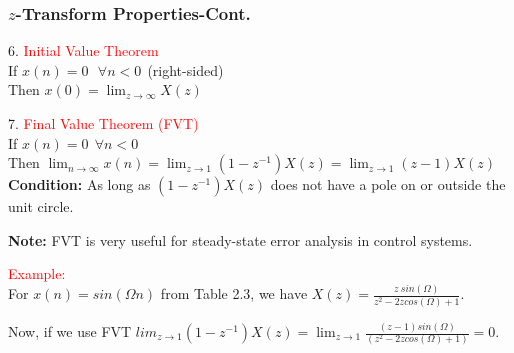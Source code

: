 \documentclass[mathserif, 10pt]{beamer} %
\begin{document}
\frame
{
\frametitle{$z$-Transform Properties-Cont.}

6. \textcolor{red} {Initial Value Theorem}\\ \vspace{.1in}
If $x(n) = 0~~~\forall n<0 ~~$(right-sided)\\ \vspace{.1in}
Then $x(0) =\lim_{z\to\infty} X(z)$\\ \vspace{.1in}

7.  \textcolor{red}{Final Value Theorem (FVT)} \\ \vspace{.1in}
If $x(n) = 0~~\forall n<0$ \\ \vspace{.1in}
Then $\lim_{n \to \infty} x(n) = \lim_{z \to 1} (1-z^{-1})X(z) = \lim_{z \to 1} (z-1)X(z)$ \\ \vspace{.1in}
\textbf{Condition:} As long as $(1-z^{-1})X(z)$ does not have a pole on or outside the unit circle. \\ \vspace{.1in}

\textbf{Note:} FVT is very useful for steady-state error analysis in control systems. \\ \vspace{.1in}

\textcolor{red} {Example:}\\ \vspace{.1in}
For $x(n) = sin( \Omega n)$ from Table 2.3, we have $X(z) = \frac{z~sin(\Omega)}{z^2-2zcos(\Omega ) +1}$. \\ \vspace{.08in}

Now, if we use FVT $lim_{z \to 1}(1-z^{-1})X(z) =  \lim_{z \to 1} \frac{(z-1)sin(\Omega)}{(z^2-2zcos(\Omega)+1)} = 0$.
}
\end{document}
